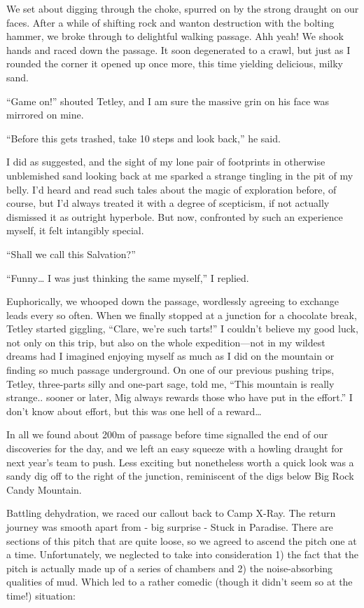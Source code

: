 We set about digging through the choke, spurred on by the strong draught
on our faces. After a while of shifting rock and wanton destruction with
the bolting hammer, we broke through to delightful walking passage. Ahh
yeah! We shook hands and raced down the passage. It soon degenerated to
a crawl, but just as I rounded the corner it opened up once more, this
time yielding delicious, milky sand.

``Game on!'' shouted Tetley, and I am sure the massive grin on his face
was mirrored on mine.

``Before this gets trashed, take 10 steps and look back,'' he said.

I did as suggested, and the sight of my lone pair of footprints in
otherwise unblemished sand looking back at me sparked a strange tingling
in the pit of my belly. I'd heard and read such tales about the magic of
exploration before, of course, but I'd always treated it with a degree
of scepticism, if not actually dismissed it as outright hyperbole. But
now, confronted by such an experience myself, it felt intangibly
special.

``Shall we call this Salvation?''

``Funny\ldots{} I was just thinking the same myself,'' I replied.

Euphorically, we whooped down the passage, wordlessly agreeing to
exchange leads every so often. When we finally stopped at a junction for
a chocolate break, Tetley started giggling, ``Clare, we're such tarts!''
I couldn't believe my good luck, not only on this trip, but also on the
whole expedition---not in my wildest dreams had I imagined enjoying
myself as much as I did on the mountain or finding so much passage
underground. On one of our previous pushing trips, Tetley, three-parts
silly and one-part sage, told me, ``This mountain is really strange..
sooner or later, Mig always rewards those who have put in the effort.''
I don't know about effort, but this was one hell of a reward\ldots{}

In all we found about 200m of passage before time signalled the end of
our discoveries for the day, and we left an easy squeeze with a howling
draught for next year's team to push. Less exciting but nonetheless
worth a quick look was a sandy dig off to the right of the junction,
reminiscent of the digs below Big Rock Candy Mountain.

Battling dehydration, we raced our callout back to Camp X-Ray. The
return journey was smooth apart from - big surprise - Stuck in Paradise.
There are sections of this pitch that are quite loose, so we agreed to
ascend the pitch one at a time. Unfortunately, we neglected to take into
consideration 1) the fact that the pitch is actually made up of a series
of chambers and 2) the noise-absorbing qualities of mud. Which led to a
rather comedic (though it didn't seem so at the time!) situation:

